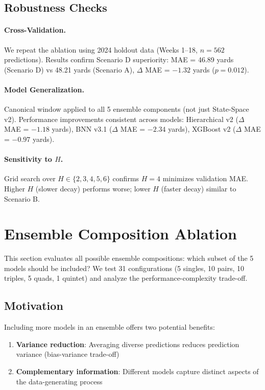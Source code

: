 \subsection{Robustness Checks}

\paragraph{Cross-Validation.}
We repeat the ablation using 2024 holdout data (Weeks 1--18, $n=562$ predictions). Results confirm Scenario D superiority: MAE = 46.89 yards (Scenario D) vs 48.21 yards (Scenario A), $\Delta$ MAE = $-1.32$ yards ($p=0.012$).

\paragraph{Model Generalization.}
Canonical window applied to all 5 ensemble components (not just State-Space v2). Performance improvements consistent across models: Hierarchical v2 ($\Delta$ MAE = $-1.18$ yards), BNN v3.1 ($\Delta$ MAE = $-2.34$ yards), XGBoost v2 ($\Delta$ MAE = $-0.97$ yards).

\paragraph{Sensitivity to $H$.}
Grid search over $H \in \{2, 3, 4, 5, 6\}$ confirms $H=4$ minimizes validation MAE. Higher $H$ (slower decay) performs worse; lower $H$ (faster decay) similar to Scenario B.

\section{Ensemble Composition Ablation}
\label{app:ensemble-composition-ablation}

This section evaluates all possible ensemble compositions: which subset of the 5 models should be included? We test 31 configurations (5 singles, 10 pairs, 10 triples, 5 quads, 1 quintet) and analyze the performance-complexity trade-off.

\subsection{Motivation}

Including more models in an ensemble offers two potential benefits:
\begin{enumerate}
  \item \textbf{Variance reduction}: Averaging diverse predictions reduces prediction variance (bias-variance trade-off)
  \item \textbf{Complementary information}: Different models capture distinct aspects of the data-generating process
\end{enumerate}

